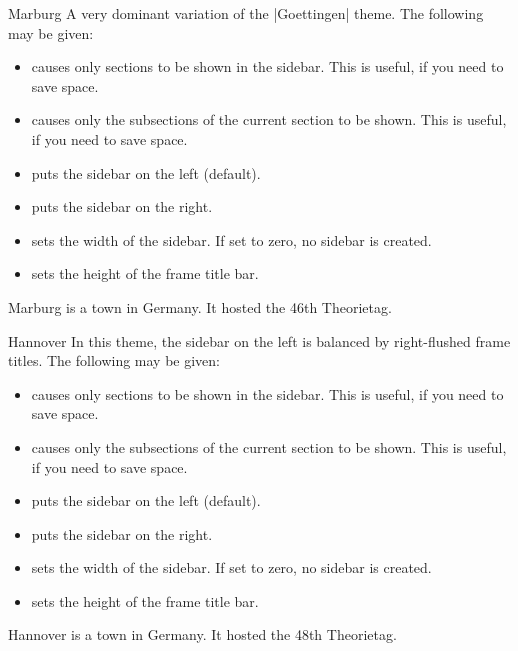 \begin{themeexample}{Marburg}
  A very dominant variation of the |Goettingen| theme. The following  may be given:
  \begin{itemize}
  \item {} causes only sections to be shown in the sidebar. This is useful, if you need to save space.
  \item {} causes only the subsections of the current section to be shown. This is useful, if you need to save space.
  \item {} puts the sidebar on the left (default).
  \item {} puts the sidebar on the right.
  \item {} sets the width of the sidebar. If set to zero, no sidebar is created.
  \item {} sets the height of the frame title bar.
  \end{itemize}

  Marburg is a town in Germany. It hosted the 46th Theorietag.
\end{themeexample}

\begin{themeexample}{Hannover}
  In this theme, the sidebar on the left is balanced by right-flushed frame titles. The following  may be given:
  \begin{itemize}
  \item {} causes only sections to be shown in the sidebar. This is useful, if you need to save space.
  \item {} causes only the subsections of the current section to be shown. This is useful, if you need to save space.
  \item {} puts the sidebar on the left (default).
  \item {} puts the sidebar on the right.
  \item {} sets the width of the sidebar. If set to zero, no sidebar is created.
  \item {} sets the height of the frame title bar.
  \end{itemize}

  Hannover is a town in Germany. It hosted the 48th Theorietag.
\end{themeexample}


